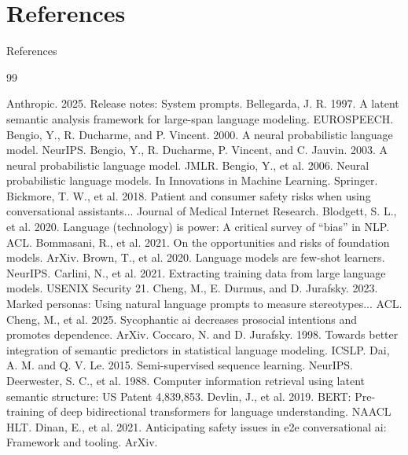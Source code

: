 \documentclass[aspectratio=169]{beamer}
\begin{document}
\section{References}

\begin{frame}[allowframebreaks]{References}\justifying
    \begin{thebibliography}{99}
    \scriptsize
    
     Anthropic. 2025. Release notes: System prompts.
     Bellegarda, J. R. 1997. A latent semantic analysis framework for large-span language modeling. EUROSPEECH.
     Bengio, Y., R. Ducharme, and P. Vincent. 2000. A neural probabilistic language model. NeurIPS.
     Bengio, Y., R. Ducharme, P. Vincent, and C. Jauvin. 2003. A neural probabilistic language model. JMLR.
     Bengio, Y., et al. 2006. Neural probabilistic language models. In Innovations in Machine Learning. Springer.
     Bickmore, T. W., et al. 2018. Patient and consumer safety risks when using conversational assistants... Journal of Medical Internet Research.
     Blodgett, S. L., et al. 2020. Language (technology) is power: A critical survey of “bias” in NLP. ACL.
     Bommasani, R., et al. 2021. On the opportunities and risks of foundation models. ArXiv.
     Brown, T., et al. 2020. Language models are few-shot learners. NeurIPS.
     Carlini, N., et al. 2021. Extracting training data from large language models. USENIX Security 21.
     Cheng, M., E. Durmus, and D. Jurafsky. 2023. Marked personas: Using natural language prompts to measure stereotypes... ACL.
     Cheng, M., et al. 2025. Sycophantic ai decreases prosocial intentions and promotes dependence. ArXiv.
     Coccaro, N. and D. Jurafsky. 1998. Towards better integration of semantic predictors in statistical language modeling. ICSLP.
     Dai, A. M. and Q. V. Le. 2015. Semi-supervised sequence learning. NeurIPS.
     Deerwester, S. C., et al. 1988. Computer information retrieval using latent semantic structure: US Patent 4,839,853.
     Devlin, J., et al. 2019. BERT: Pre-training of deep bidirectional transformers for language understanding. NAACL HLT.
     Dinan, E., et al. 2021. Anticipating safety issues in e2e conversational ai: Framework and tooling. ArXiv.

\end{thebibliography}
\end{frame}
\end{document}
